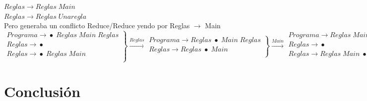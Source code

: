 \documentclass[10pt,a4paper]{article}
\begin{document}
$Reglas\rightarrow{}Reglas\;Main$\\
$Reglas\rightarrow{}Reglas\;Unaregla$\\
Pero generaba un conflicto Reduce/Reduce yendo por Reglas $\rightarrow$ Main\\
$\left.\begin{matrix}
Programa\rightarrow{}\bullet\;Reglas\;Main\;Reglas\\
Reglas\rightarrow{} \bullet\\
Reglas\rightarrow{} \bullet\;Reglas\;Main\\
\end{matrix}\right\} \xrightarrow{Reglas}
\left.\begin{matrix}
Programa\rightarrow{}Reglas\;\bullet\;Main\;Reglas\\
Reglas\rightarrow{} Reglas\;\bullet\;Main\\
\end{matrix}\right\}\xrightarrow{Main}
\left.\begin{matrix}
Programa\rightarrow{}Reglas\;Main\;\bullet\;Reglas\\
Reglas\rightarrow{} \bullet \\
Reglas\rightarrow{} Reglas\;Main\;\bullet\\
\end{matrix}\right\}$
\section{Conclusión}
\end{document}
